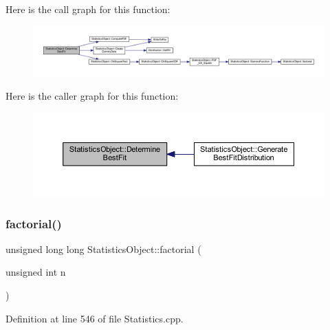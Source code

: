 Here is the call graph for this function\+:\nopagebreak
\begin{figure}[H]
\begin{center}
\leavevmode
\includegraphics[width=350pt]{class_statistics_object_a13305945c9536243f926b61d554c2dd4_cgraph}
\end{center}
\end{figure}
Here is the caller graph for this function\+:\nopagebreak
\begin{figure}[H]
\begin{center}
\leavevmode
\includegraphics[width=350pt]{class_statistics_object_a13305945c9536243f926b61d554c2dd4_icgraph}
\end{center}
\end{figure}
\mbox{\label{class_statistics_object_a033c5346639a0dd44b68838a49bdd926}} 
\subsubsection{\texorpdfstring{factorial()}{factorial()}}
{\footnotesize\ttfamily unsigned long long Statistics\+Object\+::factorial (\begin{DoxyParamCaption}\item[{unsigned int}]{n }\end{DoxyParamCaption})\hspace{0.3cm}{\ttfamily [protected]}}



Definition at line 546 of file Statistics.\+cpp.

